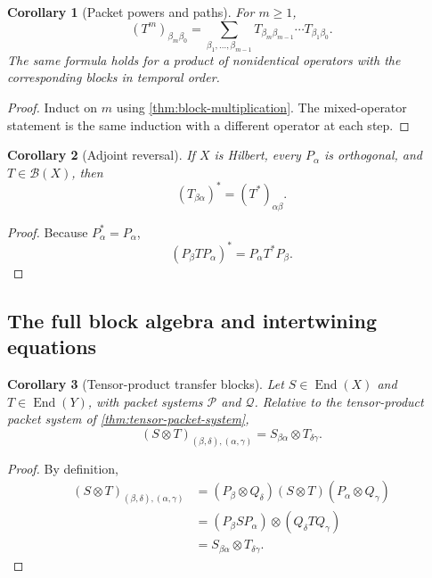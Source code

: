 \documentclass[11pt]{article}
\newtheorem{corollary}[corollary]{Corollary}
\theoremstyle{definition}
\theoremstyle{remark}
\theoremstyle{definition}\newtheorem{example}[theorem]{Example}
\newcommand{\Pcal}{\mathcal P}
\newcommand{\Qcal}{\mathcal Q}
\newcommand{\End}{\operatorname{End}}
\newcommand{\RecordID}[1]{\label{record:#1}}
\newcommand{\Depends}[1]{}
\newcommand{\Exports}[1]{}
\begin{document}
\begin{corollary}[Packet powers and paths]
\label{cor:block-powers}
For $m\geq1$,
\[
(T^m)_{\beta_m\beta_0}
=
\sum_{\beta_1,\ldots,\beta_{m-1}}
T_{\beta_m\beta_{m-1}}
\cdots
T_{\beta_1\beta_0}.
\]
The same formula holds for a product of nonidentical operators with the corresponding blocks in temporal order.
\end{corollary}
\RecordID{PSC-I-C-BLOCK-POWERS}
\Depends{PSC-I-T-BLOCK-MULTIPLICATION.}

\begin{proof}
Induct on $m$ using \cref{thm:block-multiplication}.  The mixed-operator statement is the same induction with a different operator at each step.
\end{proof}

\begin{corollary}[Adjoint reversal]
\label{cor:adjoint-reversal}
If $X$ is Hilbert, every $P_\alpha$ is orthogonal, and $T\in\mathcal B(X)$, then
\[
\boxed{(T_{\beta\alpha})^*=(T^*)_{\alpha\beta}.}
\]
\end{corollary}
\RecordID{PSC-I-C-ADJOINT-REVERSAL}
\Depends{PSC-I-D-TRANSFER-BLOCK.}

\begin{proof}
Because $P_\alpha^*=P_\alpha$,
\[
(P_\beta TP_\alpha)^*=P_\alpha T^*P_\beta.
\]
\end{proof}

\subsection{The full block algebra and intertwining equations}

\begin{corollary}[Tensor-product transfer blocks]
\label{cor:tensor-transfer-blocks}
Let \(S\in\End(X)\) and \(T\in\End(Y)\), with packet systems \(\Pcal\) and \(\Qcal\).  Relative to the tensor-product packet system of \cref{thm:tensor-packet-system},
\[
\boxed{
(S\otimes T)_{(\beta,\delta),(\alpha,\gamma)}
=
S_{\beta\alpha}\otimes T_{\delta\gamma}.
}
\]
\end{corollary}
\RecordID{PSC-I-C-TENSOR-TRANSFER-BLOCKS}
\Depends{PSC-I-T-TENSOR-PACKET-SYSTEM and PSC-I-D-TRANSFER-BLOCK.}
\Exports{Tensor-network, quantum-circuit, and multivariate packet calculations.}

\begin{proof}
By definition,
\begin{align*}
(S\otimes T)_{(\beta,\delta),(\alpha,\gamma)}
&=(P_\beta\otimes Q_\delta)(S\otimes T)(P_\alpha\otimes Q_\gamma)\\
&=(P_\beta SP_\alpha)\otimes(Q_\delta TQ_\gamma)\\
&=S_{\beta\alpha}\otimes T_{\delta\gamma}.
\end{align*}
\end{proof}
\end{document}
